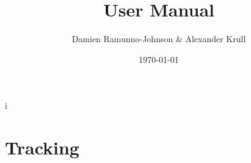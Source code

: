 \documentclass[10pt,letterpaper]{report}
\title{User Manual}
\date{\today}
\author{Damien Ramunno-Johnson \& Alexander Krull}
\begin{document}
\maketitle
\newpage
{}i

\tableofcontents
\newpage
\listoffigures
\newpage
\listoftables
\newpage
{}

\graphicspath{{./figures/}}

\chapter{Tracking}

\end{document}
